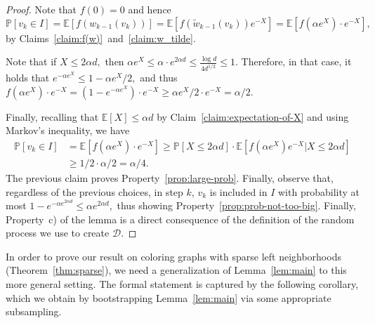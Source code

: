 \documentclass[10pt]{amsart}
\newenvironment{claimproof}[1][\proofname]{\proof[#1]\renewcommand{\qedsymbol}{$\blacksquare$}}{\endproof}
\theoremstyle{definition}
\newcommand{\mbE}{\mathbb{E}}
\renewcommand{\Pr}{\mathbb{P}}
\begin{document}
\begin{proof}
\begin{claimproof}
    Note that $f(0)=0$ and hence
    \[ \Pr[v_k \in I] = \mbE[f(w_{k-1}(v_k))] = \mbE[f(\tilde{w}_{k-1}(v_k)) e^{-X}] = \mbE[f(\alpha e^X) \cdot e^{-X}], \]
    by Claims~\ref{claim:f(w)}~and~\ref{claim:w_tilde}.

    Note that if $X \le 2 \alpha d,$ then $\alpha e^X\le \alpha \cdot e^{2 \alpha d} \le \frac{\log d}{4 d^{1/2}}\le 1.$ Therefore, in that case, it holds that $e^{- \alpha e^X} \le 1 - \alpha e^X / 2,$ and thus $f(\alpha e^X) \cdot e^{-X} = (1 - e^{-\alpha e^X}) \cdot e^{-X} \ge \alpha e^X / 2 \cdot e^{-X}=
    \alpha / 2.$

    Finally, recalling that $\mbE[X] \le \alpha d$ by Claim~\ref{claim:expectation-of-X} and using Markov's inequality, we have
    \begin{align*}
         \Pr[v_k \in I] &= \mbE[f(\alpha e^X) \cdot e^{-X}] \ge \Pr[X \le 2 \alpha d] \cdot \mbE[f(\alpha e^X) e^{-X} \vert X \le 2 \alpha d]\\
         &\ge 1/2 \cdot \alpha / 2 = \alpha / 4.
    \end{align*}
\end{claimproof}
The previous claim proves Property~\ref{prop:large-prob}. Finally, observe that, regardless of the previous choices, in step $k$, $v_k$ is included in $I$ with probability at most $1 - e^{- \alpha e^{2 \alpha d}} \le \alpha e^{2 \alpha d},$ thus showing Property~\ref{prop:prob-not-too-big}. Finally, Property~c) of the lemma is a direct consequence of the definition of the random process we use to create $\mathcal{D}$.
\end{proof}

In order to prove our result on coloring graphs with sparse left neighborhoods (Theorem~\ref{thm:sparse}), we need a generalization of Lemma~\ref{lem:main} to this more general setting. The formal statement is captured by the following corollary, which we obtain by bootstrapping Lemma~\ref{lem:main} via some appropriate subsampling.
\end{document}
